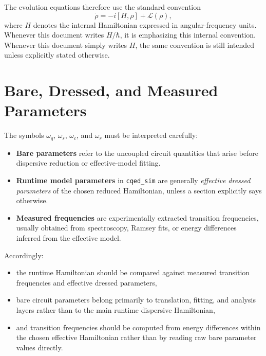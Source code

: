 \documentclass[11pt]{article}
\begin{document}
\noindent
The evolution equations therefore use the standard convention
\[
\dot{\rho} = -i[H,\rho] + \mathcal{L}(\rho),
\]
where \(H\) denotes the internal Hamiltonian expressed in angular-frequency units.
Whenever this document writes \(H/\hbar\), it is emphasizing this internal convention.
Whenever this document simply writes \(H\), the same convention is still intended
unless explicitly stated otherwise.

\section{Bare, Dressed, and Measured Parameters}
The symbols \(\omega_q\), \(\omega_s\), \(\omega_c\), and \(\omega_r\) must be
interpreted carefully:
\begin{itemize}[leftmargin=1.5em]
  \item \textbf{Bare parameters} refer to the uncoupled circuit quantities that arise
  before dispersive reduction or effective-model fitting.
  \item \textbf{Runtime model parameters} in \texttt{cqed\_sim} are generally
  \emph{effective dressed parameters} of the chosen reduced Hamiltonian, unless a
  section explicitly says otherwise.
  \item \textbf{Measured frequencies} are experimentally extracted transition
  frequencies, usually obtained from spectroscopy, Ramsey fits, or energy
  differences inferred from the effective model.
\end{itemize}

\noindent
Accordingly:
\begin{itemize}[leftmargin=1.5em]
  \item the runtime Hamiltonian should be compared against measured transition
  frequencies and effective dressed parameters,
  \item bare circuit parameters belong primarily to translation, fitting, and
  analysis layers rather than to the main runtime dispersive Hamiltonian,
  \item and transition frequencies should be computed from energy differences
  within the chosen effective Hamiltonian rather than by reading raw bare
  parameter values directly.
\end{itemize}
\end{document}
